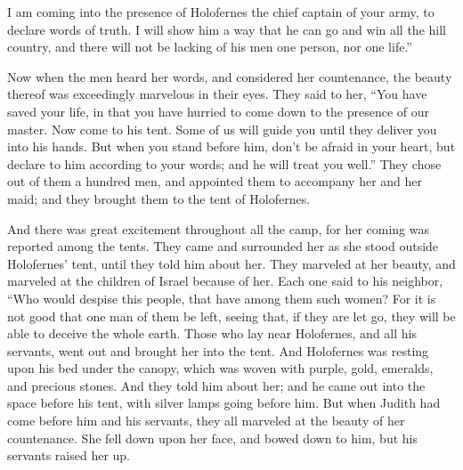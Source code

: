 {I am coming into the presence of Holofernes the chief captain of your army, to declare words of truth. I will show him a way that he can go and win all the hill country, and there will not be lacking of his men one person, nor one life.”
\par }{\PP {}Now when the men heard her words, and considered her countenance, the beauty thereof was exceedingly marvelous in their eyes. They said to her,
“You have saved your life, in that you have hurried to come down to the presence of our master. Now come to his tent. Some of us will guide you until they deliver you into his hands.
But when you stand before him, don’t be afraid in your heart, but declare to him according to your words; and he will treat you well.”
They chose out of them a hundred men, and appointed them to accompany her and her maid; and they brought them to the tent of Holofernes.
\par }{\PP {}And there was great excitement throughout all the camp, for her coming was reported among the tents. They came and surrounded her as she stood outside Holofernes’ tent, until they told him about her.
They marveled at her beauty, and marveled at the children of Israel because of her. Each one said to his neighbor, “Who would despise this people, that have among them such women? For it is not good that one man of them be left, seeing that, if they are let go, they will be able to deceive the whole earth.
Those who lay near Holofernes, and all his servants, went out and brought her into the tent.
And Holofernes was resting upon his bed under the canopy, which was woven with purple, gold, emeralds, and precious stones.
And they told him about her; and he came out into the space before his tent, with silver lamps going before him.
But when Judith had come before him and his servants, they all marveled at the beauty of her countenance. She fell down upon her face, and bowed down to him, but his servants raised her up.

}
